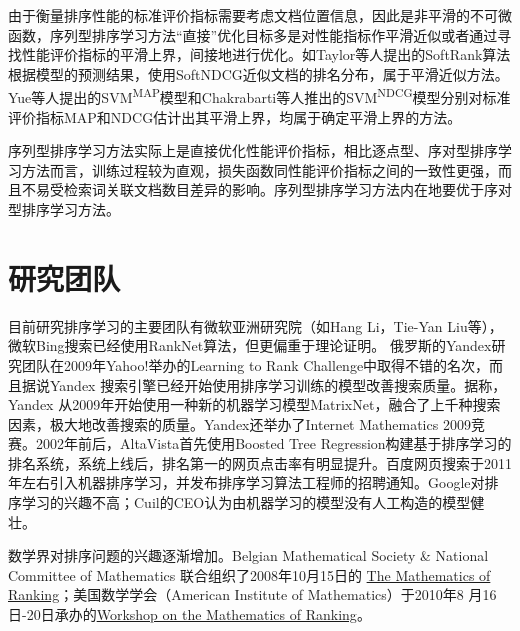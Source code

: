 由于衡量排序性能的标准评价指标需要考虑文档位置信息，因此是非平滑的不可微函数，序列型排序学习方法“直接”优化目标多是对性能指标作平滑近似或者通过寻找性能评价指标的平滑上界，间接地进行优化。如Taylor等人\cite{taylor2008softrank}提出的SoftRank算法根据模型的预测结果，使用SoftNDCG近似文档的排名分布，属于平滑近似方法。Yue等人\cite{yue2007support}提出的SVM\textsuperscript{MAP}模型和Chakrabarti等人\cite{chakrabarti2008structured}推出的SVM\textsuperscript{NDCG}模型分别对标准评价指标MAP和NDCG估计出其平滑上界，均属于确定平滑上界的方法。

序列型排序学习方法实际上是直接优化性能评价指标，相比逐点型、序对型排序学习方法而言，训练过程较为直观，损失函数同性能评价指标之间的一致性更强，而且不易受检索词关联文档数目差异的影响。序列型排序学习方法内在地要优于序对型排序学习方法。

\section{研究团队}
目前研究排序学习的主要团队有微软亚洲研究院（如Hang Li，Tie-Yan Liu等），微软Bing搜索已经使用RankNet算法，但更偏重于理论证明。
俄罗斯的Yandex研究团队在2009年Yahoo!举办的Learning to Rank Challenge中取得不错的名次，而且据说Yandex 搜索引擎已经开始使用排序学习训练的模型改善搜索质量。据称，Yandex 从2009年开始使用一种新的机器学习模型MatrixNet，融合了上千种搜索因素，极大地改善搜索的质量。Yandex还举办了Internet Mathematics 2009竞赛。2002年前后，AltaVista首先使用Boosted Tree Regression构建基于排序学习的排名系统，系统上线后，排名第一的网页点击率有明显提升。百度网页搜索于2011年左右引入机器排序学习，并发布排序学习算法工程师的招聘通知。Google对排序学习的兴趣不高；Cuil的CEO认为由机器学习的模型没有人工构造的模型健壮。

数学界对排序问题的兴趣逐渐增加。Belgian Mathematical Society \& National Committee of Mathematics 联合组织了2008年10月15日的
\href{http://nalag.cs.kuleuven.be/research/workshops/ranking/}{The Mathematics of Ranking}；美国数学学会（American Institute of Mathematics）于2010年8 月16日-20日承办的\href{http://www.aimath.org/ARCC/workshops/mathofranking.html}{Workshop on the Mathematics of Ranking}。


